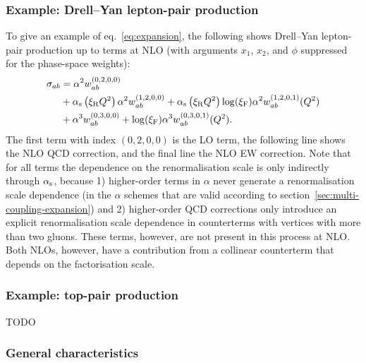 \subsubsection{Example: Drell--Yan lepton-pair production}
\label{sec:pineappl-example}

To give an example of eq.~\eqref{eq:expansion}, the following shows Drell--Yan lepton-pair production up to terms at NLO (with arguments $x_1$, $x_2$, and $\phi$ suppressed for the phase-space weights):
\begin{equation}
\begin{split}
\sigma_{ab}
    &= \alpha^2 w_{ab}^{(0,2,0,0)} \\
    &+ \alpha_\mathrm{s} \left( \xi_\mathrm{R} Q^2 \right) \alpha^2 w_{ab}^{(1,2,0,0)} + \alpha_\mathrm{s} \left( \xi_\mathrm{R} Q^2 \right) \log (\xi_\mathrm{F}) \alpha^2 w_{ab}^{(1,2,0,1)} (Q^2) \\
    &+ \alpha^3 w_{ab}^{(0,3,0,0)} + \log (\xi_\mathrm{F}) \alpha^3 w_{ab}^{(0,3,0,1)} (Q^2) \text{.}
\end{split}
\end{equation}
The first term with index $(0,2,0,0)$ is the LO term, the following line shows the NLO QCD correction, and the final line the NLO EW correction.
Note that for all terms the dependence on the renormalisation scale is only indirectly through $\alpha_\mathrm{s}$, because 1) higher-order terms in $\alpha$ never generate a renormalisation scale dependence (in the $\alpha$ schemes that are valid according to section~\ref{sec:multi-coupling-expansion}) and 2) higher-order QCD corrections only introduce an explicit renormalisation scale dependence in counterterms with vertices with more than two gluons.
These terms, however, are not present in this process at NLO\@.
Both NLOs, however, have a contribution from a collinear counterterm that depends on the factorisation scale.


\subsubsection{Example: top-pair production}

TODO

\subsubsection{General characteristics}

